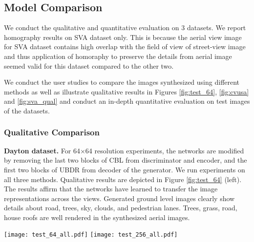 \documentclass[times,twocolumn,final,authoryear]{elsarticle_modified}
\begin{document}
\vspace{-10pt}

\subsection{Model Comparison} 
We conduct the qualitative and quantitative evaluation on 3 datasets. We report homography results on SVA dataset only.
This is because the aerial view image for SVA dataset contains high overlap with the field of view of street-view image and thus application of homoraphy to preserve the details from aerial image seemed valid for this dataset compared to the other two. 

We conduct the user studies to compare the images synthesized using different methods as well as illustrate qualitative results in Figures \ref{fig:test_64}, \ref{fig:cvusa} and \ref{fig:sva_qual} and conduct an in-depth quantitative evaluation on test images of the datasets.

\vspace{-5pt}

\subsubsection{Qualitative Comparison}



\noindent \textbf{Dayton dataset.} For 64$\times$64 resolution experiments, the networks are modified by removing the last two blocks of CBL from discriminator and encoder, and the first two blocks of UBDR from decoder of the generator. We run experiments on all three methods. Qualitative results are depicted in Figure \ref{fig:test_64} (left). The results affirm that the networks have learned to transfer the image representations across the views. Generated ground level images clearly show details about road, trees, sky, clouds, and pedestrian lanes. Trees, grass, road, house roofs are well rendered in the synthesized aerial images.

\begin{figure*}
\centering
\texttt{[image: test\_64\_all.pdf]} \hspace*{5pt}
\texttt{[image: test\_256\_all.pdf]}
\vspace{-18pt}
\caption{\small \label{fig:test_64}Example images generated by different methods in low (64 $ \times$ 64) resolution (left) 
and high (256 $ \times$ 256) resolution (right) in  \textbf{a2g} and \textbf{g2a} directions on the \textbf{Dayton} dataset.}
  \vspace{-10pt}
\end{figure*}
\end{document}

